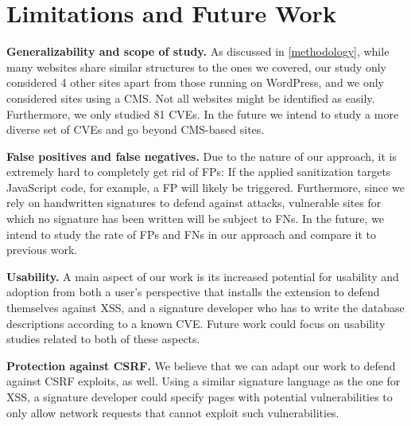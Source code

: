 \section{Limitations and Future Work}

\textbf{Generalizability and scope of study.} As discussed in \autoref{methodology}, while many websites share similar structures to the ones we covered, our study only considered 4 other sites apart from those running on WordPress, and we only considered sites using a CMS. Not all websites might be identified as easily. Furthermore, we only studied 81 CVEs. %
In the future we intend to study a more diverse set of CVEs and go beyond CMS-based sites.

\textbf{False positives and false negatives.} Due to the nature of our approach, it is extremely hard to completely get rid of FPs: If the applied sanitization targets JavaScript code, for example, a FP will likely be triggered. Furthermore, since we rely on handwritten signatures to defend against attacks, vulnerable sites for which no signature has been written will be subject to FNs. In the future, we intend to study the rate of FPs and FNs in our approach and compare it to previous work.


\textbf{Usability.} A main aspect of our work is its increased potential for usability and adoption from both a user's perspective that installs the extension to defend themselves against \ac{XSS}, and a signature developer who has to write the database descriptions according to a known CVE. Future work could focus on usability studies related to both of these aspects.

\textbf{Protection against CSRF.} We believe that we can adapt our work to defend against \ac{CSRF} exploits, as well. Using a similar signature language as the one for \ac{XSS}, a signature developer could specify pages with potential vulnerabilities to only allow network requests that cannot exploit such vulnerabilities.

